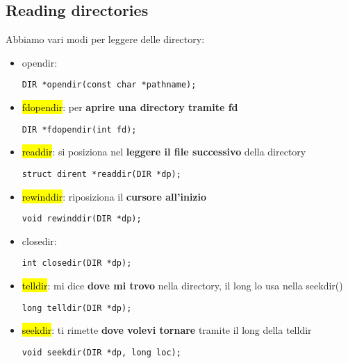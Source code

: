 \subsection{Reading directories}

Abbiamo vari modi per leggere delle directory:

\begin{itemize}
	\item opendir:

\begin{lstlisting}
DIR *opendir(const char *pathname);
\end{lstlisting}

	\item \hl{fdopendir}: per \textbf{aprire una directory tramite fd}

\begin{lstlisting}
DIR *fdopendir(int fd); 
\end{lstlisting}

	\item \hl{readdir}: si posiziona nel \textbf{leggere il file successivo} della directory

\begin{lstlisting}
struct dirent *readdir(DIR *dp); 
\end{lstlisting}

	\item \hl{rewinddir}: riposiziona il \textbf{cursore all'inizio}

\begin{lstlisting}
void rewinddir(DIR *dp); 
\end{lstlisting}

	\item closedir:

\begin{lstlisting}
int closedir(DIR *dp);
\end{lstlisting}

	\item \hl{telldir}: mi dice \textbf{dove mi trovo} nella directory, il long lo usa nella seekdir()

\begin{lstlisting}
long telldir(DIR *dp);
\end{lstlisting}

	\item \hl{seekdir}: ti rimette \textbf{dove volevi tornare} tramite il long della telldir

\begin{lstlisting}
void seekdir(DIR *dp, long loc);
\end{lstlisting}

\end{itemize}


